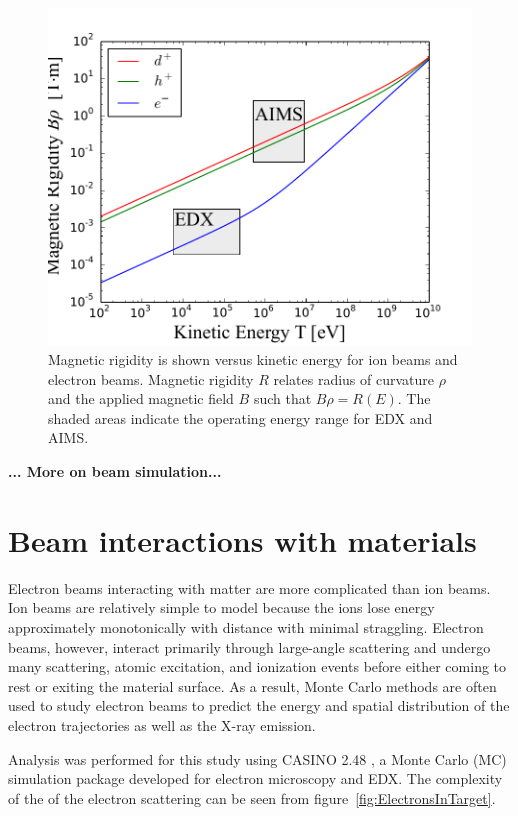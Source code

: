 \documentclass[12pt,letterpaper,final]{article}
\begin{document}
\begin{figure}[!h]
 \centering
  \includegraphics[width=\columnwidth]{figures/MagneticRigidity.pdf}
 \caption{Magnetic rigidity is shown versus kinetic energy for ion beams and electron beams. Magnetic rigidity $R$ relates radius of curvature $\rho$ and the applied magnetic field $B$ such that $B\rho = R(E)$. The shaded areas indicate the operating energy range for EDX and AIMS.}
 \label{fig:Rigidity}
\end{figure}

\textbf{... More on beam simulation...}

\section{Beam interactions with materials}
\label{sec:BeamInteractions}
Electron beams interacting with matter are more complicated than ion beams. Ion beams are relatively simple to model because the ions lose energy approximately monotonically with distance with minimal straggling. Electron beams, however, interact primarily through large-angle scattering and undergo many scattering, atomic excitation, and ionization events before either coming to rest or exiting the material surface. As a result, Monte Carlo methods are often used to study electron beams to predict the energy and spatial distribution of the electron trajectories as well as the X-ray emission. 

Analysis was performed for this study using CASINO 2.48 \cite{CASINO}, a Monte Carlo (MC) simulation package developed for electron microscopy and EDX. The complexity of the of the electron scattering can be seen from figure~\ref{fig:ElectronsInTarget}.
\end{document}

